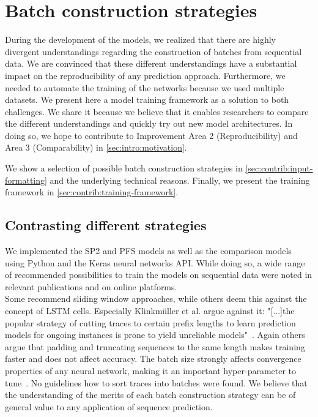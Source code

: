 \chapter{Batch construction strategies}\label{chap:training-framework}
During the development of the models, we realized that there are highly divergent understandings regarding the construction of batches from sequential data.
We are convinced that these different understandings have a substantial impact on the reproducibility of any prediction approach.
Furthermore, we needed to automate the training of the networks because we used multiple datasets.
We present here a model training framework as a solution to both challenges.
We share it because we believe that it enables researchers to compare the different understandings and quickly try out new model architectures.
In doing so, we hope to contribute to Improvement Area 2 (Reproducibility) and Area 3 (Comparability) in \autoref{sec:intro:motivation}.

We show a selection of possible batch construction strategies in \autoref{sec:contrib:input-formatting} and the underlying technical reasons. Finally, we present the training framework in \autoref{sec:contrib:training-framework}.

\section{Contrasting different strategies}\label{sec:contrib:input-formatting}
We implemented the SP2 and PFS models as well as the comparison models using Python and the Keras neural networks API.
While doing so, a wide range of recommended possibilities to train the models on sequential data were noted in relevant publications and on online platforms.\\

Some recommend sliding window approaches, while others deem this against the concept of LSTM cells.
Especially Klinkmüller et al. argue against it: "[...]the popular strategy of cutting traces to certain prefix lengths to learn prediction models for ongoing instances is prone to yield unreliable models"~\cite{klinkmuller2018reliablemonitoring}.
Again others argue that padding and truncating sequences to the same length makes training faster and does not affect accuracy.
The batch size strongly affects convergence properties of any neural network, making it an important hyper-parameter to tune~\cite{keskar2016large}.
No guidelines how to sort traces into batches were found.
We believe that the understanding of the merits of each batch construction strategy can be of general value to any application of sequence prediction.\\

